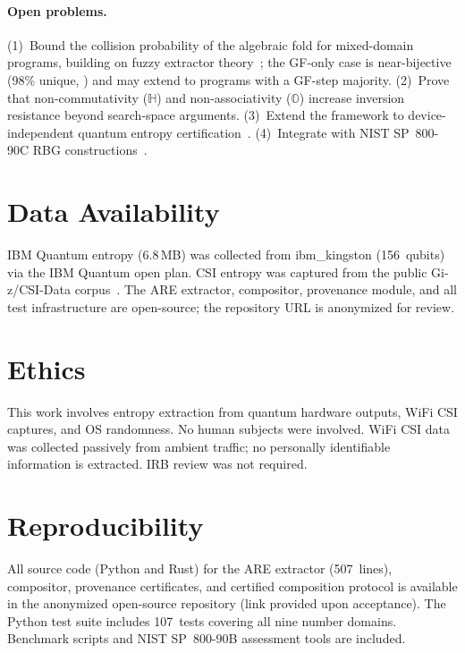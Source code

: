 \documentclass[sigconf,anonymous,review]{acmart}
\theoremstyle{acmdefinition}%
\theoremstyle{acmplain}%
\newcommand{\are}{\textsc{ARE}\xspace}
\begin{document}
\paragraph{Open problems.}
(1)~Bound the collision probability of the algebraic fold for
mixed-domain programs, building on fuzzy extractor
theory~\cite{dodis2008fuzzy}; the GF-only case is near-bijective
(98\% unique, ) and may extend to programs with
a GF-step majority.
(2)~Prove that non-commutativity ($\mathbb{H}$) and
non-associativity ($\mathbb{O}$) increase inversion resistance
beyond search-space arguments.
(3)~Extend the framework to device-independent quantum entropy
certification~\cite{aaronson2025certified}.
(4)~Integrate with NIST SP~800-90C RBG
constructions~\cite{nist2025sp80090c}.



\section*{Data Availability}
IBM Quantum entropy (6.8\,MB) was collected from ibm\_kingston (156~qubits) via the IBM Quantum open plan.
CSI entropy was captured from the public Gi-z/CSI-Data corpus~\cite{gringoli2019csidata}.
The \are extractor, compositor, provenance module, and all test infrastructure are open-source; the repository URL is anonymized for review.

\section*{Ethics}
This work involves entropy extraction from quantum hardware outputs, WiFi CSI captures, and OS randomness.
No human subjects were involved.
WiFi CSI data was collected passively from ambient traffic; no personally identifiable information is extracted.
IRB review was not required.

\section*{Reproducibility}
All source code (Python and Rust) for the \are extractor (507~lines), compositor, provenance certificates, and certified composition protocol is available in the anonymized open-source repository (link provided upon acceptance).
The Python test suite includes 107~tests covering all nine number domains.
Benchmark scripts and NIST SP~800-90B assessment tools are included.
\end{document}
